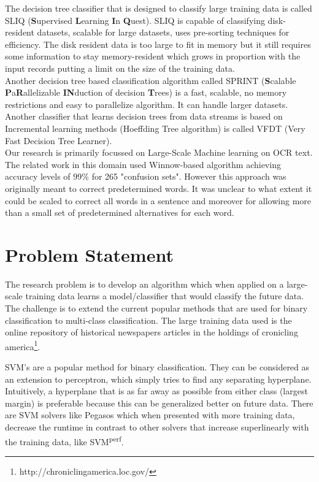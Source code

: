 \documentclass{article}
\begin{document}
The decision tree classifier that is designed to classify large training data is called SLIQ (\textbf{S}upervised \textbf{L}earning \textbf{I}n \textbf{Q}uest). SLIQ is capable of classifying disk-resident datasets, scalable for large datasets, uses pre-sorting techniques for efficiency. The disk resident data is too large to fit in memory but it still requires some information to stay memory-resident which grows in proportion with the input records putting a limit on the size of the training data.\\ Another decision tree based classification algorithm called SPRINT (\textbf{S}calable \textbf{P}a\textbf{R}allelizable \textbf{IN}duction of decision \textbf{T}rees) is a fast, scalable, no memory restrictions and easy to parallelize algorithm. It can handle larger datasets.
Another classifier that learns decision trees from data streams is based on Incremental learning methods (Hoeffding Tree algorithm) is called VFDT (Very Fast Decision Tree Learner).\\
Our research is primarily focussed on Large-Scale Machine learning on OCR text.\\
The related work in this domain used Winnow-based algorithm achieving accuracy levels of 99\% for 265 "confusion sets". However this approach was originally meant to correct predetermined words. It was unclear to what extent it could be scaled to correct all words in a sentence and moreover for allowing more than a small set of predetermined alternatives for each word.

\section{Problem Statement}
The research problem is to develop an algorithm which when applied on a large-scale training data learns a model/classifier that would classify the future data. The challenge is to extend the current popular methods that are used for binary classification to multi-class classification.
The large training data used is the online repository of historical newspapers articles in the holdings of cronicling america\footnote{http://chroniclingamerica.loc.gov/}.

SVM's are a popular method for binary classification. They can be considered as an extension to perceptron, which simply tries to find any separating hyperplane. Intuitively, a hyperplane that is as far away as possible from either class (largest margin) is preferable because this can be generalized better on future data.
There are SVM solvers like Pegasos which when presented with more training data, decrease the runtime in contrast to other solvers that increase superlinearly with the training data, like SVM\textsuperscript{perf}.
 
\end{document}
